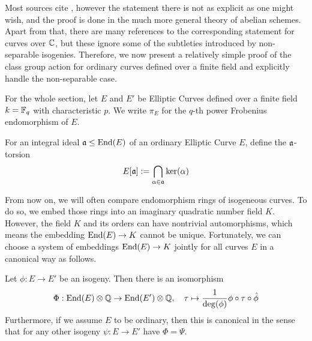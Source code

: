 Most sources cite \cite[Thm~4.5]{class_group_action_waterhouse}, however the statement there is not as explicit as one might wish, and the proof is done in the much more general theory of abelian schemes.
Apart from that, there are many references to the corresponding statement for curves over $\mathbb{C}$, but these ignore some of the subtleties introduced by non-separable isogenies. 
Therefore, we now present a relatively simple proof of the class group action for ordinary curves defined over a finite field and explicitly handle the non-separable case.

For the whole section, let $E$ and $E'$ be Elliptic Curves defined over a finite field $k = \mathbb{F}_q$ with characteristic $p$.
We write $\pi_E$ for the $q$-th power Frobenius endomorphism of $E$.
\begin{definition}
    For an integral ideal $\mathfrak{a} \leq \mathrm{End}(E)$ of an ordinary Elliptic Curve $E$, define the $\mathfrak{a}$-torsion
    \begin{equation*}
        E[\mathfrak{a}] := \bigcap_{\alpha \in \mathfrak{a}} \ker(\alpha)
    \end{equation*}
\end{definition}
From now on, we will often compare endomorphism rings of isogeneous curves.
To do so, we embed those rings into an imaginary quadratic number field $K$.
However, the field $K$ and its orders can have nontrivial automorphisms, which means the embedding $\mathrm{End}(E) \to K$ cannot be unique.
Fortunately, we can choose a system of embeddings $\mathrm{End}(E) \to K$ jointly for all curves $E$ in a canonical way as follows.
\begin{lemma}
    Let $\phi: E \to E'$ be an isogeny.
    Then there is an isomorphism
    \begin{equation*}
        \Phi: \mathrm{End}(E) \otimes \mathbb{Q} \to \mathrm{End}(E') \otimes \mathbb{Q}, \quad \tau \mapsto \frac 1 {\deg(\phi)} \phi \circ \tau \circ \hat{\phi}
    \end{equation*}
    Furthermore, if we assume $E$ to be ordinary, then this is canonical in the sense that for any other isogeny $\psi: E \to E'$ have $\Phi = \Psi$.
\end{lemma}
